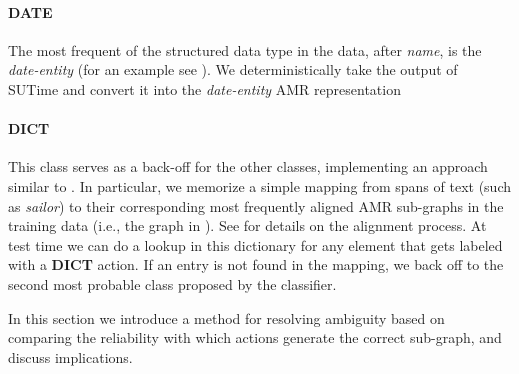 \documentclass[11pt]{article}
\newcommand\w[1]{\textit{#1}} %
\newcommand\n[1]{\textit{#1}} %
\begin{document}
\paragraph{DATE} The most frequent of the structured data type in the data, after \n{name}, is the \n{date-entity} (for an example see ).
We deterministically take the output of SUTime \cite{2012chang-temporal}
  and convert it into the \n{date-entity} AMR representation

\paragraph{DICT} This class serves as a back-off for the other classes, implementing
an approach similar to .
In particular, we memorize a simple mapping from spans of text
  (such as \w{sailor}) to their corresponding most frequently aligned AMR sub-graphs 
  in the training data (i.e., the graph in ). 
See  for details on the alignment process.
At test time we can do a lookup in this dictionary for any element that gets 
  labeled with a \textbf{DICT} action. 
If an entry is not found in the mapping, we back off to the second most probable
  class proposed by the classifier.


%
%


In this section we introduce a method for resolving ambiguity based on comparing the reliability with which actions generate the correct sub-graph, and discuss implications.

\end{document}
